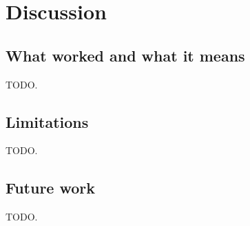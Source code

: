 \section{Discussion}
\label{sec:discussion}

\subsection{What worked and what it means}
TODO.

\subsection{Limitations}
TODO.

\subsection{Future work}
TODO.
